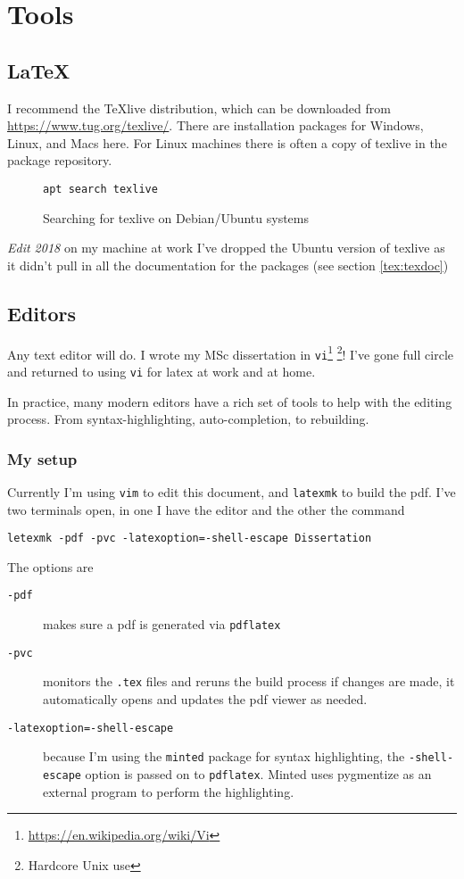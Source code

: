 
\chapter{Tools}

\section{\LaTeX}
I recommend the \TeX live distribution, which can be downloaded from
\url{https://www.tug.org/texlive/}.  There are installation packages for Windows, Linux, and Macs here.  For Linux machines there is often a copy of texlive in the package repository.

\begin{figure}[h]
\begin{verbatim}
apt search texlive
\end{verbatim}
    \caption{Searching for texlive on Debian/Ubuntu systems}
    \label{}
\end{figure}
\emph{Edit 2018\/} on my machine at work I've dropped the Ubuntu version of
texlive as it didn't pull in all the documentation for the packages (see section
\ref{tex:texdoc})
\section{Editors}
Any text editor will do.   I wrote my MSc dissertation in \texttt{vi}\footnote{\url{https://en.wikipedia.org/wiki/Vi}}
\footnote{Hardcore Unix use}!  I've gone full circle and returned to using
\texttt{vi} for latex at work and at home.

In practice, many modern editors have a rich set of tools to help with the editing process.  From syntax-highlighting, auto-completion, to rebuilding.

\subsection{My setup}
Currently I'm using \texttt{vim} to edit this document, and \texttt{latexmk} to
build  the pdf.   I've two terminals open, in one I have the editor and the
other the command
\begin{verbatim}
letexmk -pdf -pvc -latexoption=-shell-escape Dissertation
\end{verbatim}

The options are
\begin{description}
	\item[\texttt{-pdf}] makes sure a pdf is generated via \texttt{pdflatex}
	\item[\texttt{-pvc}] monitors the \texttt{.tex} files and reruns the build
		process if changes are made, it automatically opens and updates the pdf
		viewer as needed.
	\item[\texttt{-latexoption=-shell-escape}] because I'm using the
		\texttt{minted} package for syntax highlighting, the
		\texttt{-shell-escape} option is passed on to \texttt{pdflatex}.  Minted
		uses pygmentize as an external program to perform the highlighting.
\end{description}
		
